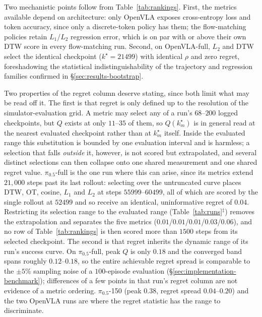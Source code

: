 \documentclass[english,12pt,a4paper,pdftex,elec,utf8]{aaltothesis}
\begin{document}
Two mechanistic points follow from Table~\ref{tab:rankings}. First, the metrics available depend on architecture: only OpenVLA exposes cross-entropy loss and token accuracy, since only a discrete-token policy has them; the flow-matching policies retain $L_1$/$L_2$ regression error, which is on par with or above their own DTW score in every flow-matching run. Second, on OpenVLA-full, $L_2$ and DTW select the identical checkpoint ($k^\star=21499$) with identical $\rho$ and zero regret, foreshadowing the statistical indistinguishability of the trajectory and regression families confirmed in \S\ref{sec:results-bootstrap}.

Two properties of the regret column deserve stating, since both limit what may be read off it. The
first is that regret is only defined up to the resolution of the simulator-evaluation grid. A metric
may select any of a run's $68$--$200$ logged checkpoints, but $Q$ exists at only $11$--$35$ of them,
so $Q(k_m^\star)$ is in general read at the nearest evaluated checkpoint rather than at
$k_m^\star$ itself. Inside the evaluated range this substitution is bounded by one evaluation
interval and is harmless; a selection that falls \emph{outside} it, however, is not scored but
extrapolated, and several distinct selections can then collapse onto one shared measurement and one
shared regret value. $\pi_{0.5}$-full is the one run where this can arise, since its metrics extend
$21{,}000$ steps past its last rollout: selecting over the untruncated curve places DTW, OT, cosine,
$L_1$ and $L_2$ at steps $55999$--$60499$, all of which are scored by the single rollout at $52499$
and so receive an identical, uninformative regret of $0.04$. Restricting its selection range to the
evaluated range (Table~\ref{tab:runs}$^\ddagger$) removes the extrapolation and separates the five
metrics ($0.01$/$0.01$/$0.01$/$0.03$/$0.06$), and no row of Table~\ref{tab:rankings} is then scored
more than $1500$ steps from its selected checkpoint.
The second is that regret inherits the dynamic range of its run's success curve. On $\pi_{0.5}$-full,
peak $Q$ is only $0.18$ and the converged band spans roughly $0.12$--$0.18$, so the entire
achievable regret spread is comparable to the $\pm5\%$ sampling noise of a $100$-episode evaluation
(\S\ref{sec:implementation-benchmark}); differences of a few points in that run's regret column are
not evidence of a metric ordering. $\pi_{0.5}$-150 (peak $0.38$, regret spread $0.04$--$0.20$) and
the two OpenVLA runs are where the regret statistic has the range to discriminate.
\end{document}
